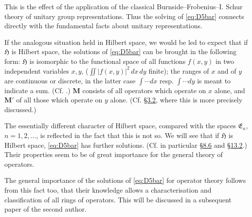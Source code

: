 \documentclass[12pt,b5paper,twoside]{article}
\newcommand{\Hspace}{\mathfrak H}
\newcommand{\M}{\mathbf M}
\newcommand{\secref}[1]{\hyperref[sec:#1]{\S#1}}
\begin{document}
This is the effect of the application of the classical
Burnside--Frobenius--I. Schur theory of unitary group representations. Thus the
solving of \eqref{eq:D5bar} connects directly with the fundamental facts about
unitary representations.

If the analogous situation held in Hilbert space, we would be led to expect that
if $\Hspace$ is Hilbert space, the solutions of \eqref{eq:D5bar} can be brought
in the following form: $\Hspace$ is isomorphic to the functional space of all
functions $f(x,y)$ in two independent variables $x,y$,
($\iint |f(x,y)|^2\,dx\,dy$ finite); the ranges of $x$ and of $y$ are continuous
or discrete, in the latter case $\int\cdots dx$ resp. $\int\cdots dy$ is meant to
indicate a sum. (Cf. \cite[pp.~69 and 108--111]{ref16}.) $\M$ consists of all
operators which operate on $x$ alone, and $\M'$ of all those which operate on
$y$ alone. (Cf. \secref{3.2}, where this is more precisely discussed.)

The essentially different character of Hilbert space, compared with the spaces
$\mathfrak E_n$, $n=1,2,\ldots$, is reflected in the fact that this is not so. We
will see that if $\Hspace$ is Hilbert space, \eqref{eq:D5bar} has further
solutions. (Cf. in particular \secref{8.6} and \secref{13.2}.) Their properties
seem to be of great importance for the general theory of operators.

The general importance of the solutions of \eqref{eq:D5bar} for operator
theory follows from this fact too, that their knowledge allows a characterisation
and classification of all rings of operators. This will be discussed in a
subsequent paper of the second author.
\end{document}
